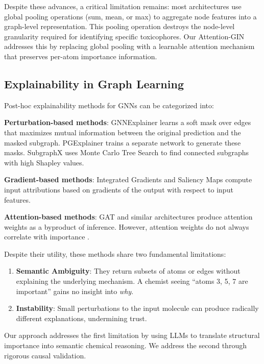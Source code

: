 \documentclass[conference]{IEEEtran}
\begin{document}
Despite these advances, a critical limitation remains: most architectures use global pooling operations (sum, mean, or max) to aggregate node features into a graph-level representation. This pooling operation destroys the node-level granularity required for identifying specific toxicophores. Our Attention-GIN addresses this by replacing global pooling with a learnable attention mechanism that preserves per-atom importance information.

\subsection{Explainability in Graph Learning}

Post-hoc explainability methods for GNNs can be categorized into:

\textbf{Perturbation-based methods}: GNNExplainer \cite{ying2019gnnexplainer} learns a soft mask over edges that maximizes mutual information between the original prediction and the masked subgraph. PGExplainer \cite{luo2020parameterized} trains a separate network to generate these masks. SubgraphX \cite{yuan2021explainability} uses Monte Carlo Tree Search to find connected subgraphs with high Shapley values.

\textbf{Gradient-based methods}: Integrated Gradients \cite{sundararajan2017axiomatic} and Saliency Maps compute input attributions based on gradients of the output with respect to input features.

\textbf{Attention-based methods}: GAT and similar architectures produce attention weights as a byproduct of inference. However, attention weights do not always correlate with importance \cite{jain2019attention}.

Despite their utility, these methods share two fundamental limitations:
\begin{enumerate}
    \item \textbf{Semantic Ambiguity}: They return subsets of atoms or edges without explaining the underlying mechanism. A chemist seeing ``atoms 3, 5, 7 are important'' gains no insight into \textit{why}.
    \item \textbf{Instability}: Small perturbations to the input molecule can produce radically different explanations, undermining trust.
\end{enumerate}

Our approach addresses the first limitation by using LLMs to translate structural importance into semantic chemical reasoning. We address the second through rigorous causal validation.
\end{document}
